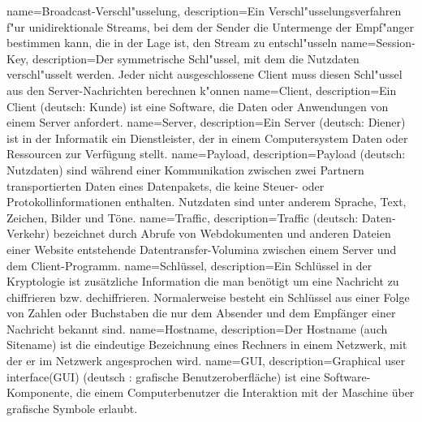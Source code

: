 {
  name=Broadcast-Verschl"usselung,
  description={Ein Verschl"usselungsverfahren f"ur unidirektionale Streams, bei dem der
  Sender die Untermenge der Empf"anger bestimmen kann, die in der Lage ist, den Stream
  zu entschl"usseln}
}
{
  name=Session-Key,
  description={Der symmetrische Schl"ussel, mit dem die Nutzdaten verschl"usselt werden.
  Jeder nicht ausgeschlossene Client muss diesen Schl"ussel aus den Server-Nachrichten
  berechnen k"onnen}
}
{
  name=Client,
  description={Ein Client (deutsch: Kunde) ist eine Software, die Daten oder Anwendungen
  von einem Server anfordert.}
}
{
  name=Server,
  description={Ein Server (deutsch: Diener) ist in der Informatik ein Dienstleister,
	der in einem Computersystem Daten oder Ressourcen zur Verfügung stellt.}
}
{
  name=Payload,
  description={Payload (deutsch: Nutzdaten) sind während einer Kommunikation zwischen
  zwei Partnern transportierten Daten eines Datenpakets, die keine Steuer- oder Protokollinformationen enthalten.
  Nutzdaten sind unter anderem Sprache, Text, Zeichen, Bilder und Töne.}
}
{
  name=Traffic,
  description={Traffic (deutsch: Daten-Verkehr) bezeichnet durch Abrufe von Webdokumenten
  und anderen Dateien einer Website entstehende Datentransfer-Volumina zwischen einem Server und dem Client-Programm.}
}
{
  name=Schlüssel,
  description={Ein Schlüssel in der Kryptologie ist zusätzliche Information die man benötigt um eine
	Nachricht zu chiffrieren bzw. dechiffrieren. Normalerweise besteht ein Schlüssel aus einer Folge von
	Zahlen oder Buchstaben die nur dem Absender und dem Empfänger einer Nachricht bekannt sind.}
}
{
  name=Hostname,
  description={Der Hostname (auch Sitename) ist die eindeutige Bezeichnung eines Rechners in einem Netzwerk,
  mit der er im Netzwerk angesprochen wird.}
}
{
  name=GUI,
  description={Graphical user interface(GUI) (deutsch : grafische Benutzeroberfläche) ist eine Software-Komponente,
  die einem Computerbenutzer die Interaktion mit der Maschine über grafische Symbole erlaubt.}
}

\renewcommand*{\glossaryname}{\section{\glossarName}}

\glsaddall
\printglossaries

